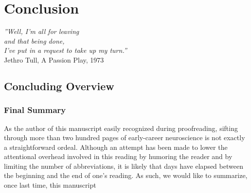 \chapter{Conclusion}
\begin{flushright}
    \textit{''Well, I'm all for leaving \\
            and that being done,\\
            I've put in a request to take up my turn.''}\\
    Jethro Tull, A Passion Play, 1973
\end{flushright}



\section{Concluding Overview}
\subsection{Final Summary}
As the author of this manuscript easily recognized during proofreading, sifting through more than two hundred pages of early-career neuroscience is not exactly a straightforward ordeal. Although an attempt has been made to lower the attentional overhead involved in this reading by humoring the reader and by limiting the number of abbreviations, it is likely that days have elapsed between the beginning and the end of one's reading. As such, we would like to summarize, once last time, this manuscript

